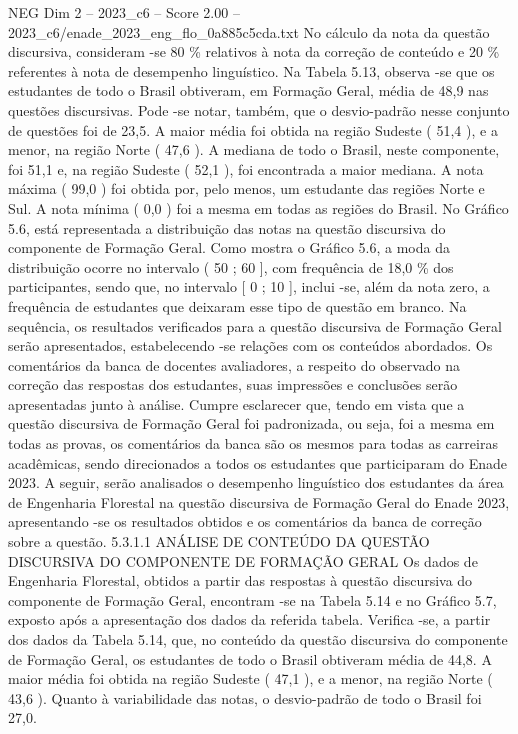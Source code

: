 \begin{textsample}{NEG Dim 2 – 2023\_c6 – Score 2.00 – 2023\_c6/enade\_2023\_eng\_flo\_0a885c5cda.txt}
No cálculo da nota da questão discursiva, consideram -se 80 \% relativos à nota da correção de conteúdo e 20 \% referentes à nota de desempenho linguístico.
Na Tabela 5.13, observa -se que os estudantes de todo o Brasil obtiveram, em Formação Geral, média de 48,9 nas questões discursivas.
Pode -se notar, também, que o desvio-padrão nesse conjunto de questões foi de 23,5.
A maior média foi obtida na região Sudeste ( 51,4 ), e a menor, na região Norte ( 47,6 ).
A mediana de todo o Brasil, neste componente, foi 51,1 e, na região Sudeste ( 52,1 ), foi encontrada a maior mediana.
A nota máxima ( 99,0 ) foi obtida por, pelo menos, um estudante das regiões Norte e Sul.
A nota mínima ( 0,0 ) foi a mesma em todas as regiões do Brasil.
No Gráfico 5.6, está representada a distribuição das notas na questão discursiva do componente de Formação Geral.
Como mostra o Gráfico 5.6, a moda da distribuição ocorre no intervalo ( 50 ; 60 ], com frequência de 18,0 \% dos participantes, sendo que, no intervalo [ 0 ; 10 ], inclui -se, além da nota zero, a frequência de estudantes que deixaram esse tipo de questão em branco.
Na sequência, os resultados verificados para a questão discursiva de Formação Geral serão apresentados, estabelecendo -se relações com os conteúdos abordados.
Os comentários da banca de docentes avaliadores, a respeito do observado na correção das respostas dos estudantes, suas impressões e conclusões serão apresentadas junto à análise.
Cumpre esclarecer que, tendo em vista que a questão discursiva de Formação Geral foi padronizada, ou seja, foi a mesma em todas as provas, os comentários da banca são os mesmos para todas as carreiras acadêmicas, sendo direcionados a todos os estudantes que participaram do Enade 2023.
A seguir, serão analisados o desempenho linguístico dos estudantes da área de Engenharia Florestal na questão discursiva de Formação Geral do Enade 2023, apresentando -se os resultados obtidos e os comentários da banca de correção sobre a questão. 5.3.1.1 ANÁLISE DE CONTEÚDO DA QUESTÃO DISCURSIVA DO COMPONENTE DE FORMAÇÃO GERAL Os dados de Engenharia Florestal, obtidos a partir das respostas à questão discursiva do componente de Formação Geral, encontram -se na Tabela 5.14 e no Gráfico 5.7, exposto após a apresentação dos dados da referida tabela.
Verifica -se, a partir dos dados da Tabela 5.14, que, no conteúdo da questão discursiva do componente de Formação Geral, os estudantes de todo o Brasil obtiveram média de 44,8.
A maior média foi obtida na região Sudeste ( 47,1 ), e a menor, na região Norte ( 43,6 ).
Quanto à variabilidade das notas, o desvio-padrão de todo o Brasil foi 27,0.

\end{textsample}

